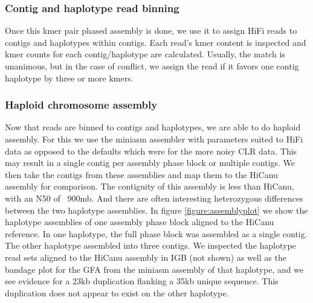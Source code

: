 {\subsubsection{Contig and haplotype read binning}

\par{
Once this kmer pair phased assembly is done, we use it to assign HiFi reads to contigs and haplotypes within contigs. Each read's kmer content is inspected and kmer counts for each contig/haplotype are calculated. Usually, the match is unanimous, but in the case of conflict, we assign the read if it favors one contig haplotype by three or more kmers. 
}

\subsubsection{Haploid chromosome assembly}

\par{
Now that reads are binned to contigs and haplotypes, we are able to do haploid assembly. For this we use the miniasm assembler with parameters suited to HiFi data as opposed to the defaults which were for the more noisy CLR data\cite{miniasm}. This may result in a single contig per assembly phase block or multiple contigs. We then take the contigs from these assemblies and map them to the HiCanu assembly for comparison. The contiguity of this assembly is less than HiCanu, with an N50 of ~900mb. And there are often interesting heterozygous differences between the two haplotype assemblies. In figure \ref{figure:assemblyplot} we show the haplotype assemblies of one assembly phase block aligned to the HiCanu reference. In one haplotype, the full phase block was assembled as a single contig. The other haplotype assembled into three contigs. We inspected the haplotype read sets aligned to the HiCanu assembly in IGB (not shown) as well as the bandage plot for the GFA from the miniasm assembly of that haplotype, and we see evidence for a 23kb duplication flanking a 35kb unique sequence\cite{bandage}. This duplication does not appear to exist on the other haplotype.
}

}
